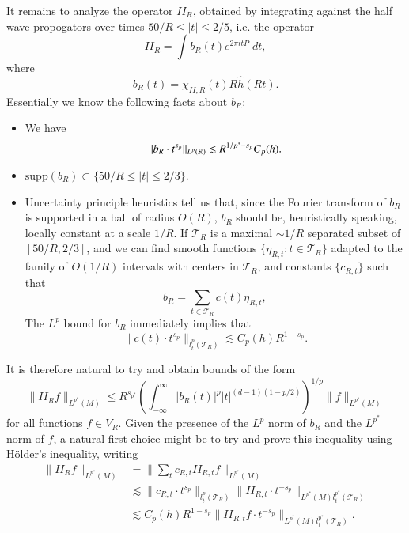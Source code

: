 It remains to analyze the operator $II_R$, obtained by integrating against the half wave propogators over times $50/R \leq |t| \leq 2/5$, i.e. the operator
%
\[ II_R = \int b_R(t) e^{2 \pi i t P}\; dt, \]
%
where
%
\[ b_R(t) = \chi_{II,R}(t) R \widehat{h}(Rt). \]
%
Essentially we know the following facts about $b_R$:
%
\begin{itemize}
    \item We have
    \[ \| b_R \cdot t^{s_p} \|_{L^p(\operatorname{\mathbb{R}})} \lesssim R^{1/p^* - s_p} C_p(h). \]

    \item $\text{supp}(b_R) \subset \{ 50/R \leq |t| \leq 2/3 \}$.

    \item Uncertainty principle heuristics tell us that, since the Fourier transform of $b_R$ is supported in a ball of radius $O(R)$, $b_R$ should be, heuristically speaking, locally constant at a scale $1/R$. If $\mathcal{T}_R$ is a maximal $\sim 1/R$ separated subset of $[50/R, 2/3]$, and we can find smooth functions $\{ \eta_{R,t} : t \in \mathcal{T}_R \}$ adapted to the family of $O(1/R)$ intervals with centers in $\mathcal{T}_R$, and constants $\{ c_{R,t} \}$ such that
    \[ b_R = \sum_{t \in \mathcal{T}_R} c(t) \eta_{R,t}, \]
    The $L^p$ bound for $b_R$ immediately implies that
    \[ \| c(t) \cdot t^{s_p} \|_{l^p_t(\mathcal{T}_R)} \lesssim C_p(h) R^{1 - s_p}. \]
\end{itemize}
%
It is therefore natural to try and obtain bounds of the form
%
\[ \| II_R f \|_{L^{p^*}(M)} \leq R^{s_{p^*}} \left( \int_{-\infty}^\infty |b_R(t)|^p |t|^{(d-1)(1 - p/2)}  \right)^{1/p} \| f \|_{L^{p^*}(M)} \]
%
for all functions $f \in V_R$. Given the presence of the $L^p$ norm of $b_R$ and the $L^{p^*}$ norm of $f$, a natural first choice might be to try and prove this inequality using H\"{o}lder's inequality, writing
\begin{align*}
    \| II_R f \|_{L^{p^*}(M)} &= \| \sum_t c_{R,t} II_{R,t} f \|_{L^{p^*}(M)}\\
    &\lesssim \| c_{R,t} \cdot t^{s_p} \|_{l^p_t(\mathcal{T}_R)} \| II_{R,t} \cdot t^{- s_p} \|_{L^{p^*}(M) l^{p^*}_t(\mathcal{T}_R)}\\
    &\lesssim C_p(h) R^{1 - s_p} \| II_{R,t} f \cdot t^{-s_p} \|_{L^{p^*}(M) l^{p^*}_t(\mathcal{T}_R)}.
\end{align*}
